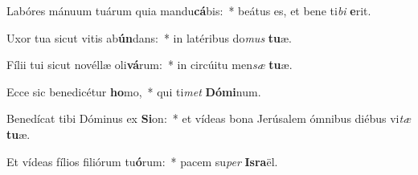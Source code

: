 \item Labóres mánuum tuárum quia mandu\textbf{cá}bis:~* beátus es, et bene ti\textit{bi} \textbf{e}rit.
\item Uxor tua sicut vitis ab\textbf{ún}dans:~* in latéribus do\textit{mus} \textbf{tu}æ.
\item Fílii tui sicut novéllæ oli\textbf{vá}rum:~* in circúitu men\textit{sæ} \textbf{tu}æ.
\item Ecce sic benedicétur \textbf{ho}mo,~* qui ti\textit{met} \textbf{Dó}\textbf{mi}num.
\item Benedícat tibi Dóminus ex \textbf{Si}on:~* et vídeas bona Jerúsalem ómnibus diébus vi\textit{tæ} \textbf{tu}æ.
\item Et vídeas fílios filiórum tu\textbf{ó}rum:~* pacem su\textit{per} \textbf{Is}\textbf{ra}ël.
